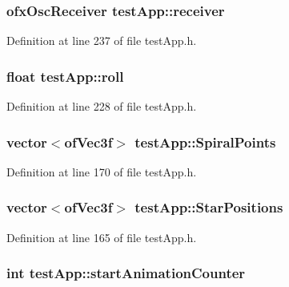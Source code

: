 \hypertarget{classtest_app_a034c44ff60fa1e5f021e90d5410ba657}{
\subsubsection[{receiver}]{\setlength{\rightskip}{0pt plus 5cm}ofx\-Osc\-Receiver test\-App\-::receiver}}\label{classtest_app_a034c44ff60fa1e5f021e90d5410ba657}


Definition at line 237 of file test\-App.\-h.

\hypertarget{classtest_app_a020730abb55e6ae6d0a28edee19050e0}{
\subsubsection[{roll}]{\setlength{\rightskip}{0pt plus 5cm}float test\-App\-::roll}}\label{classtest_app_a020730abb55e6ae6d0a28edee19050e0}


Definition at line 228 of file test\-App.\-h.

\hypertarget{classtest_app_af0dd2f3e3aabdb43bee49d74c156dc05}{
\subsubsection[{Spiral\-Points}]{\setlength{\rightskip}{0pt plus 5cm}vector$<$of\-Vec3f$>$ test\-App\-::\-Spiral\-Points}}\label{classtest_app_af0dd2f3e3aabdb43bee49d74c156dc05}


Definition at line 170 of file test\-App.\-h.

\hypertarget{classtest_app_a68d0d30cea64a9d39a1b2deef16677ad}{
\subsubsection[{Star\-Positions}]{\setlength{\rightskip}{0pt plus 5cm}vector$<$of\-Vec3f$>$ test\-App\-::\-Star\-Positions}}\label{classtest_app_a68d0d30cea64a9d39a1b2deef16677ad}


Definition at line 165 of file test\-App.\-h.

\hypertarget{classtest_app_a577bf117cf10109de967ea0d3ca17f1f}{
\subsubsection[{start\-Animation\-Counter}]{\setlength{\rightskip}{0pt plus 5cm}int test\-App\-::start\-Animation\-Counter}}\label{classtest_app_a577bf117cf10109de967ea0d3ca17f1f}


